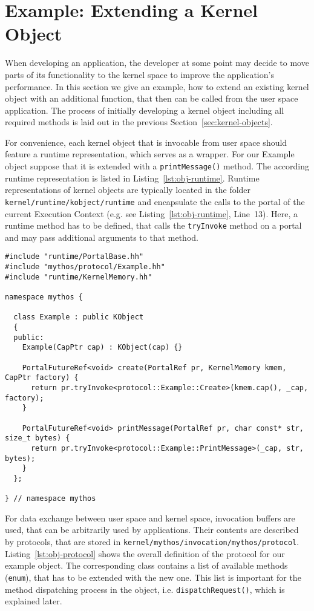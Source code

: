 \section{Example: Extending a Kernel Object}
\label{sec:objects-example}

When developing an application, the developer at some point may decide to move
parts of its functionality to the kernel space to improve the application's
performance. In this section we give an example, how to extend an existing
kernel object with an additional function, that then can be called from the user space
application. The process of initially developing a kernel object including all
required methods is laid out in the previous Section~\ref{sec:kernel-objects}.

For convenience, each kernel object that is invocable from user space should
feature a runtime representation, which serves as a wrapper.  For our Example
object suppose that it is extended with a \texttt{printMessage()} method.  
The according runtime representation is listed in
Listing~\ref{lst:obj-runtime}. Runtime representations of kernel objects are
typically located in the folder \texttt{kernel/runtime/kobject/runtime} and
encapsulate the calls to the portal of the current Execution Context (e.g. see
Listing~\ref{lst:obj-runtime}, Line~13). Here, a runtime method has to be
defined, that calls the \texttt{tryInvoke} method on a portal and may pass
additional arguments to that method.

\lstset{language=c++,caption=Object's Runtime Representation,label=lst:obj-runtime}
\begin{lstlisting}
#include "runtime/PortalBase.hh"
#include "mythos/protocol/Example.hh"
#include "runtime/KernelMemory.hh"

namespace mythos {

  class Example : public KObject
  {
  public:
    Example(CapPtr cap) : KObject(cap) {}

    PortalFutureRef<void> create(PortalRef pr, KernelMemory kmem, CapPtr factory) {
      return pr.tryInvoke<protocol::Example::Create>(kmem.cap(), _cap, factory);
    }

    PortalFutureRef<void> printMessage(PortalRef pr, char const* str, size_t bytes) {
      return pr.tryInvoke<protocol::Example::PrintMessage>(_cap, str, bytes);
    }
  };

} // namespace mythos
\end{lstlisting}

For data exchange between user space and kernel space, invocation buffers are
used, that can be arbitrarily used by applications. Their contents are described
by protocols, that are stored in
\texttt{kernel/mythos/invocation/mythos/protocol}.
Listing~\ref{lst:obj-protocol} shows the overall definition of the protocol for
our example object. The corresponding class contains a list of available
methods (\texttt{enum}), that has to be extended with the new one. This list is important
for the method dispatching process in the object, i.e. \texttt{dispatchRequest()},
which is explained later. 

